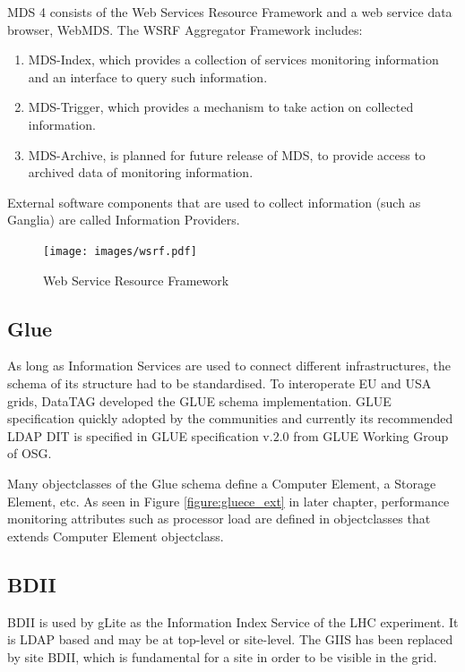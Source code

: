 MDS 4 consists of the Web Services Resource Framework and a web service data
browser, WebMDS. The WSRF Aggregator Framework includes:

\begin{enumerate}
  \item MDS-Index, which provides a collection of services monitoring
  information and an interface to query such information.
  \item MDS-Trigger, which provides a mechanism to take action on collected
  information.
  \item MDS-Archive, is planned for future release of MDS, to provide access to
  archived data of monitoring information.
\end{enumerate}

External software components that are used to collect information (such as
Ganglia)\cite{gangliaWSRF} are called Information Providers.

\begin{figure}[htb]
\centering
 \texttt{[image: images/wsrf.pdf]}
\caption{Web Service Resource Framework}
\label{figure:wsrf}
\end{figure}

\subsection{Glue}
As long as Information Services are used to connect different infrastructures,
the schema of its structure had to be standardised. To interoperate EU and USA
grids, DataTAG developed the GLUE schema implementation. GLUE specification
quickly adopted by the communities and currently its recommended LDAP DIT is
specified in GLUE specification v.$2.0$ from GLUE Working Group of OSG.

Many objectclasses of the Glue schema define a Computer Element, a Storage
Element, etc. As seen in Figure \ref{figure:gluece_ext} in later chapter,
performance monitoring attributes such as processor load are defined in
objectclasses that extends Computer Element objectclass.

\subsection{BDII}\label{subsec:bdii}
BDII is used by gLite as the Information Index Service of the LHC experiment. It
is LDAP based and may be at top-level or site-level. The GIIS has been replaced
by site BDII, which is fundamental for a site in order to be visible in the
grid.

